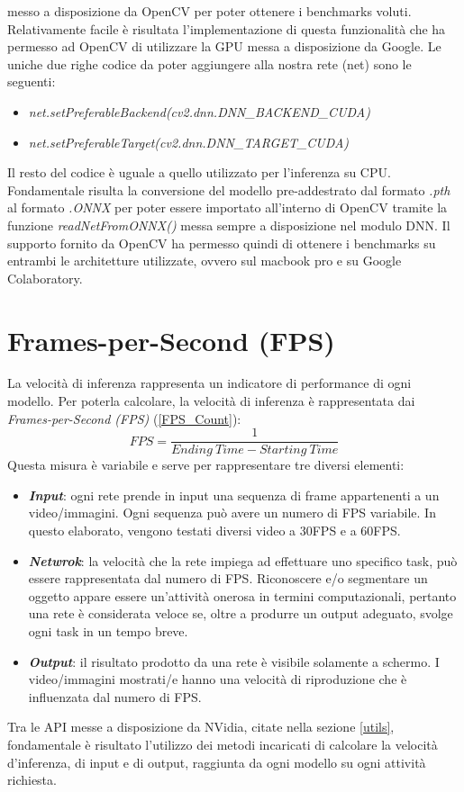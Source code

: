 messo a disposizione da OpenCV per poter ottenere i benchmarks voluti. 
Relativamente facile è risultata l'implementazione di questa funzionalità 
che ha permesso ad OpenCV di utilizzare la GPU messa a disposizione da 
Google. Le uniche due righe codice da poter aggiungere alla nostra rete 
(net) sono le seguenti:
\begin{itemize}
    \item \emph{net.setPreferableBackend(cv2.dnn.DNN\_BACKEND\_CUDA)}
    \item \emph{net.setPreferableTarget(cv2.dnn.DNN\_TARGET\_CUDA)}
\end{itemize}
Il resto del codice è uguale a quello utilizzato per l'inferenza su CPU.
Fondamentale risulta la conversione del modello pre-addestrato dal formato 
\emph{.pth} al formato \emph{.ONNX} per poter essere importato all'interno di OpenCV 
tramite la funzione \emph{readNetFromONNX()} messa sempre a disposizione nel 
modulo DNN. Il supporto fornito da OpenCV ha permesso quindi di ottenere 
i benchmarks su entrambi le architetture utilizzate, ovvero sul macbook pro 
e su Google Colaboratory.

\section{Frames-per-Second (FPS)}
La velocità di inferenza rappresenta un indicatore di performance di ogni 
modello. Per poterla calcolare, la velocità di inferenza è rappresentata dai 
\emph{Frames-per-Second (FPS)} (\ref{FPS_Count}):
\begin{equation}\label{FPS_Count}
    FPS = \frac{1}{Ending \ Time - Starting \ Time}
\end{equation}
Questa misura è variabile e serve per rappresentare tre diversi elementi:
\begin{itemize}
    \item {\bfseries{\emph{Input}}}: ogni rete prende in input una sequenza di frame appartenenti 
    a un video/immagini. Ogni sequenza può avere un numero di FPS variabile. In 
    questo elaborato, vengono testati diversi video a 30FPS e a 60FPS.
    \item {\bfseries{\emph{Netwrok}}}: la velocità che la rete impiega ad effettuare uno specifico 
    task, può essere rappresentata dal numero di FPS. Riconoscere e/o 
    segmentare un oggetto appare essere un'attività onerosa in termini 
    computazionali, pertanto una rete è considerata veloce se, oltre a 
    produrre un output adeguato, svolge ogni task in un tempo breve.
    \item {\bfseries{\emph{Output}}}: il risultato prodotto da una rete è visibile solamente a 
    schermo. I video/immagini mostrati/e hanno una velocità di riproduzione 
    che è influenzata dal numero di FPS.
\end{itemize}
Tra le API messe a disposizione da NVidia, citate nella sezione \ref{utils}, 
fondamentale è risultato l'utilizzo dei metodi incaricati di calcolare la 
velocità d'inferenza, di input e di output, raggiunta da ogni modello su ogni 
attività richiesta. 